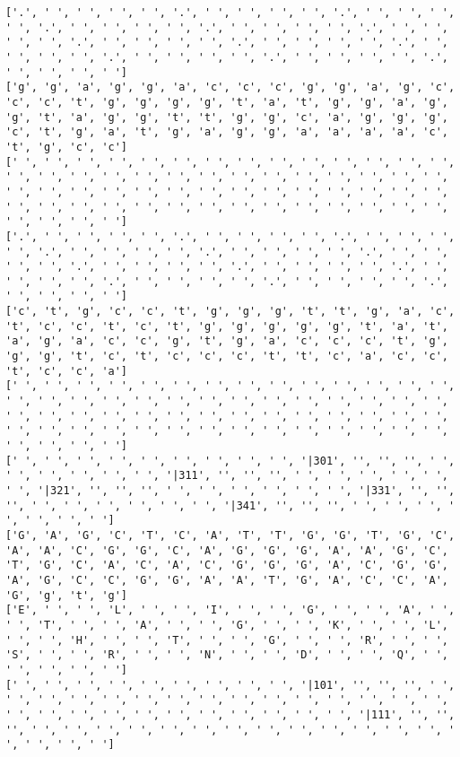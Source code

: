 \documentclass{article}
\begin{document}
\begin{Verbatim}
['.', ' ', ' ', ' ', ' ', '.', ' ', ' ', ' ', ' ', '.', ' ', ' ', ' ', ' ', '.', ' ', ' ', ' ', ' ', '.', ' ', ' ', ' ', ' ', '.', ' ', ' ', ' ', ' ', '.', ' ', ' ', ' ', ' ', '.', ' ', ' ', ' ', ' ', '.', ' ', ' ', ' ', ' ', '.', ' ', ' ', ' ', ' ', '.', ' ', ' ', ' ', ' ', '.', ' ', ' ', ' ', ' ']
['g', 'g', 'a', 'g', 'g', 'a', 'c', 'c', 'c', 'g', 'g', 'a', 'g', 'c', 'c', 'c', 't', 'g', 'g', 'g', 'g', 't', 'a', 't', 'g', 'g', 'a', 'g', 'g', 't', 'a', 'g', 'g', 't', 't', 'g', 'g', 'c', 'a', 'g', 'g', 'g', 'c', 't', 'g', 'a', 't', 'g', 'a', 'g', 'g', 'a', 'a', 'a', 'a', 'c', 't', 'g', 'c', 'c']
[' ', ' ', ' ', ' ', ' ', ' ', ' ', ' ', ' ', ' ', ' ', ' ', ' ', ' ', ' ', ' ', ' ', ' ', ' ', ' ', ' ', ' ', ' ', ' ', ' ', ' ', ' ', ' ', ' ', ' ', ' ', ' ', ' ', ' ', ' ', ' ', ' ', ' ', ' ', ' ', ' ', ' ', ' ', ' ', ' ', ' ', ' ', ' ', ' ', ' ', ' ', ' ', ' ', ' ', ' ', ' ', ' ', ' ', ' ', ' ']
['.', ' ', ' ', ' ', ' ', '.', ' ', ' ', ' ', ' ', '.', ' ', ' ', ' ', ' ', '.', ' ', ' ', ' ', ' ', '.', ' ', ' ', ' ', ' ', '.', ' ', ' ', ' ', ' ', '.', ' ', ' ', ' ', ' ', '.', ' ', ' ', ' ', ' ', '.', ' ', ' ', ' ', ' ', '.', ' ', ' ', ' ', ' ', '.', ' ', ' ', ' ', ' ', '.', ' ', ' ', ' ', ' ']
['c', 't', 'g', 'c', 'c', 't', 'g', 'g', 'g', 't', 't', 'g', 'a', 'c', 't', 'c', 'c', 't', 'c', 't', 'g', 'g', 'g', 'g', 'g', 't', 'a', 't', 'a', 'g', 'a', 'c', 'c', 'g', 't', 'g', 'a', 'c', 'c', 'c', 't', 'g', 'g', 'g', 't', 'c', 't', 'c', 'c', 'c', 't', 't', 'c', 'a', 'c', 'c', 't', 'c', 'c', 'a']
[' ', ' ', ' ', ' ', ' ', ' ', ' ', ' ', ' ', ' ', ' ', ' ', ' ', ' ', ' ', ' ', ' ', ' ', ' ', ' ', ' ', ' ', ' ', ' ', ' ', ' ', ' ', ' ', ' ', ' ', ' ', ' ', ' ', ' ', ' ', ' ', ' ', ' ', ' ', ' ', ' ', ' ', ' ', ' ', ' ', ' ', ' ', ' ', ' ', ' ', ' ', ' ', ' ', ' ', ' ', ' ', ' ', ' ', ' ', ' ']
[' ', ' ', ' ', ' ', ' ', ' ', ' ', ' ', ' ', '|301', '', '', '', ' ', ' ', ' ', ' ', ' ', ' ', '|311', '', '', '', ' ', ' ', ' ', ' ', ' ', ' ', '|321', '', '', '', ' ', ' ', ' ', ' ', ' ', ' ', '|331', '', '', '', ' ', ' ', ' ', ' ', ' ', ' ', '|341', '', '', '', ' ', ' ', ' ', ' ', ' ', ' ', ' ']
['G', 'A', 'G', 'C', 'T', 'C', 'A', 'T', 'T', 'G', 'G', 'T', 'G', 'C', 'A', 'A', 'C', 'G', 'G', 'C', 'A', 'G', 'G', 'G', 'A', 'A', 'G', 'C', 'T', 'G', 'C', 'A', 'C', 'A', 'C', 'G', 'G', 'G', 'A', 'C', 'G', 'G', 'A', 'G', 'C', 'C', 'G', 'G', 'A', 'A', 'T', 'G', 'A', 'C', 'C', 'A', 'G', 'g', 't', 'g']
['E', ' ', ' ', 'L', ' ', ' ', 'I', ' ', ' ', 'G', ' ', ' ', 'A', ' ', ' ', 'T', ' ', ' ', 'A', ' ', ' ', 'G', ' ', ' ', 'K', ' ', ' ', 'L', ' ', ' ', 'H', ' ', ' ', 'T', ' ', ' ', 'G', ' ', ' ', 'R', ' ', ' ', 'S', ' ', ' ', 'R', ' ', ' ', 'N', ' ', ' ', 'D', ' ', ' ', 'Q', ' ', ' ', ' ', ' ', ' ']
[' ', ' ', ' ', ' ', ' ', ' ', ' ', ' ', ' ', '|101', '', '', '', ' ', ' ', ' ', ' ', ' ', ' ', ' ', ' ', ' ', ' ', ' ', ' ', ' ', ' ', ' ', ' ', ' ', ' ', ' ', ' ', ' ', ' ', ' ', ' ', ' ', ' ', '|111', '', '', '', ' ', ' ', ' ', ' ', ' ', ' ', ' ', ' ', ' ', ' ', ' ', ' ', ' ', ' ', ' ', ' ', ' ']
  

\end{Verbatim}
\end{document}
